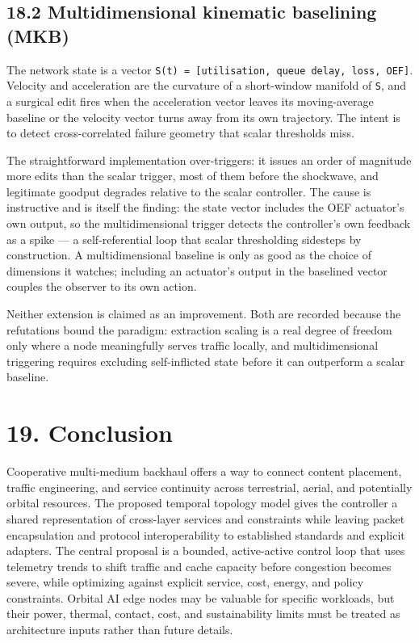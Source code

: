 \documentclass[
  american,
  11pt,
]{article}
\begin{document}
\subsection{18.2 Multidimensional kinematic baselining
(MKB)}\label{multidimensional-kinematic-baselining-mkb}

The network state is a vector
\texttt{S(t)\ =\ {[}utilisation,\ queue\ delay,\ loss,\ OEF{]}}.
Velocity and acceleration are the curvature of a short-window manifold
of \texttt{S}, and a surgical edit fires when the acceleration vector
leaves its moving-average baseline or the velocity vector turns away
from its own trajectory. The intent is to detect cross-correlated
failure geometry that scalar thresholds miss.

The straightforward implementation over-triggers: it issues an order of
magnitude more edits than the scalar trigger, most of them before the
shockwave, and legitimate goodput degrades relative to the scalar
controller. The cause is instructive and is itself the finding: the
state vector includes the OEF actuator's own output, so the
multidimensional trigger detects the controller's own feedback as a
spike --- a self-referential loop that scalar thresholding sidesteps by
construction. A multidimensional baseline is only as good as the choice
of dimensions it watches; including an actuator's output in the
baselined vector couples the observer to its own action.

Neither extension is claimed as an improvement. Both are recorded
because the refutations bound the paradigm: extraction scaling is a real
degree of freedom only where a node meaningfully serves traffic locally,
and multidimensional triggering requires excluding self-inflicted state
before it can outperform a scalar baseline.

\section{19. Conclusion}\label{conclusion}

Cooperative multi-medium backhaul offers a way to connect content
placement, traffic engineering, and service continuity across
terrestrial, aerial, and potentially orbital resources. The proposed
temporal topology model gives the controller a shared representation of
cross-layer services and constraints while leaving packet encapsulation
and protocol interoperability to established standards and explicit
adapters. The central proposal is a bounded, active-active control loop
that uses telemetry trends to shift traffic and cache capacity before
congestion becomes severe, while optimizing against explicit service,
cost, energy, and policy constraints. Orbital AI edge nodes may be
valuable for specific workloads, but their power, thermal, contact,
cost, and sustainability limits must be treated as architecture inputs
rather than future details.
\end{document}
